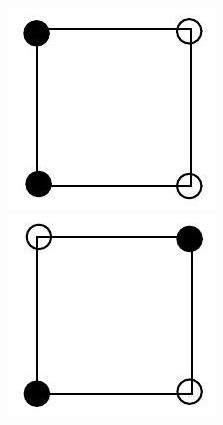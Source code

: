 \documentclass[10pt]{article}
\begin{document}
\includegraphics[max width=\textwidth, center]{2025_09_05_3ba26226ec0baddb5a03g-50(3)}\\
\includegraphics[max width=\textwidth, center]{2025_09_05_3ba26226ec0baddb5a03g-50}\\
\end{document}
